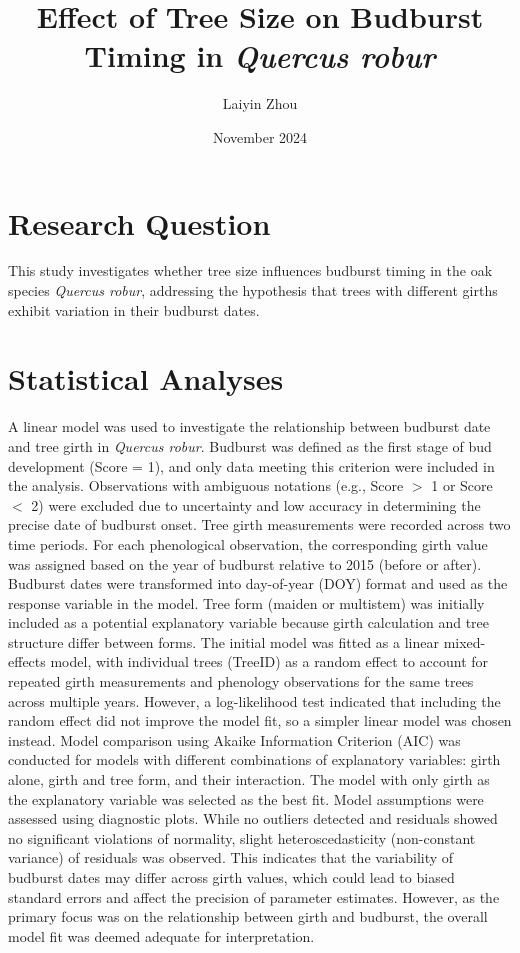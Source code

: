 \documentclass[12pt]{article}
\title{Effect of Tree Size on Budburst Timing in \textit{Quercus robur}}
\author{Laiyin Zhou}
\date{November 2024}
\begin{document}
    \maketitle

    \section{Research Question}
    This study investigates whether tree size influences budburst timing in the oak species \textit{Quercus robur}, addressing the hypothesis that trees with different girths exhibit variation in their budburst dates.
    
    \section{Statistical Analyses}
    A linear model was used to investigate the relationship between budburst date and tree girth in \textit{Quercus robur}. Budburst was defined as the first stage of bud development (Score = 1), and only data meeting this criterion were included in the analysis. Observations with ambiguous notations (e.g., Score $>$ 1 or Score $<$ 2) were excluded due to uncertainty and low accuracy in determining the precise date of budburst onset. Tree girth measurements were recorded across two time periods. For each phenological observation, the corresponding girth value was assigned based on the year of budburst relative to 2015 (before or after). Budburst dates were transformed into day-of-year (DOY) format and used as the response variable in the model. Tree form (maiden or multistem) was initially included as a potential explanatory variable because girth calculation and tree structure differ between forms. The initial model was fitted as a linear mixed-effects model, with individual trees (TreeID) as a random effect to account for repeated girth measurements and phenology observations for the same trees across multiple years. However, a log-likelihood test indicated that including the random effect did not improve the model fit, so a simpler linear model was chosen instead. Model comparison using Akaike Information Criterion (AIC) was conducted for models with different combinations of explanatory variables: girth alone, girth and tree form, and their interaction. The model with only girth as the explanatory variable was selected as the best fit. Model assumptions were assessed using diagnostic plots. While no outliers detected and residuals showed no significant violations of normality, slight heteroscedasticity (non-constant variance) of residuals was observed. This indicates that the variability of budburst dates may differ across girth values, which could lead to biased standard errors and affect the precision of parameter estimates. However, as the primary focus was on the relationship between girth and budburst, the overall model fit was deemed adequate for interpretation.
    
\end{document}
